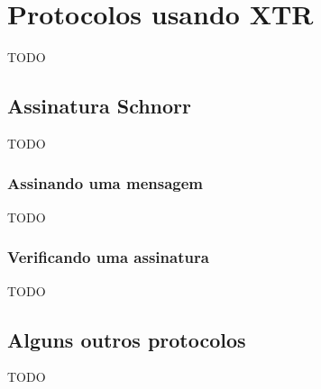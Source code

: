 \chapter{Protocolos usando XTR}
\label{sec:protc}
TODO

\section{Assinatura Schnorr}
\label{sec:protc:assinatura}

TODO

\subsection{Assinando uma mensagem}
\label{sec:protc:schnorr_sign}
TODO

\subsection{Verificando uma assinatura}
\label{sec:protc:schnorr_verify}
TODO

\section{Alguns outros protocolos}
TODO
